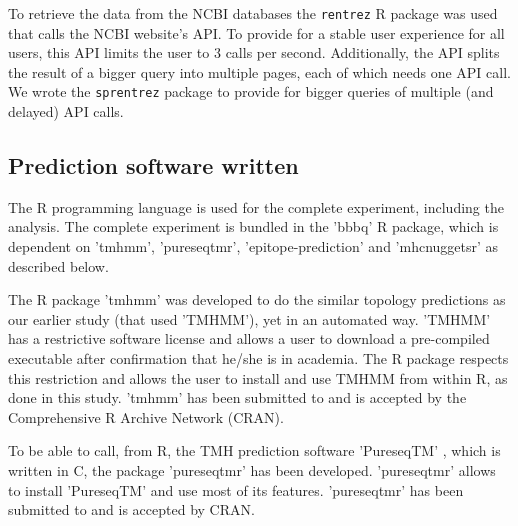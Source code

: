 To retrieve the data from the NCBI databases the
\verb;rentrez; R package \cite{rentrez} was used
that calls the NCBI website's API. To provide for a 
stable user experience for all users, 
this API limits the user to 3 calls per second.
Additionally, the API splits the result of a bigger
query into multiple pages, each of which needs one API call.
We wrote the \verb;sprentrez; package \cite{sprentrez} to provide for 
bigger queries of multiple (and delayed) API calls.

\subsection{Prediction software written}

The R programming language is used for the complete 
experiment, including the analysis.
The complete experiment is bundled in the 'bbbq' R package,
which is dependent on 'tmhmm', 'pureseqtmr', 
'epitope-prediction' and 'mhcnuggetsr'
as described below.


The R package 'tmhmm' was developed to do the similar topology
predictions as our earlier study (that used 'TMHMM'), yet in an automated way.
'TMHMM' has a restrictive software license \cite{krogh2001predicting} 
and allows a user
to download a pre-compiled executable after confirmation that he/she
is in academia. The R package respects this restriction
and allows the user to install and use TMHMM from within R,
as done in this study.
'tmhmm' has been submitted to and is accepted 
by the Comprehensive R Archive Network (CRAN).


To be able to call, from R, the TMH prediction 
software 'PureseqTM' \cite{wang2019efficient},
which is written in C, the package 'pureseqtmr' has been developed. 
'pureseqtmr' allows to install 'PureseqTM' and use most of its features.
'pureseqtmr' has been submitted to and is accepted by CRAN.


